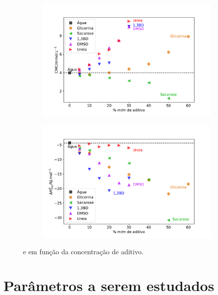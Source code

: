 		\begin{figure}[h]
			\begin{subfigure}[t]{0.5\textwidth}
				\centering
				\includegraphics[width=\textwidth]{imagens/itc/ITC_cmc_adit}
				\caption{\cmc}
				\label{fig:cmc_por_conc}
			\end{subfigure} %
			\begin{subfigure}[t]{0.5\textwidth}
				\centering
				\includegraphics[width=\textwidth]{imagens/itc/ITC_DH_adit}
				\caption{\DHmic}
				\label{fig:dh_por_conc}
			\end{subfigure}
			
			\caption{\cmc{} e \DHmic{} em função da concentração de aditivo.}
			\label{fig:cmc_dh_por_conc}
		\end{figure}
	
		\FloatBarrier
		
	\chapter{Parâmetros a serem estudados}
